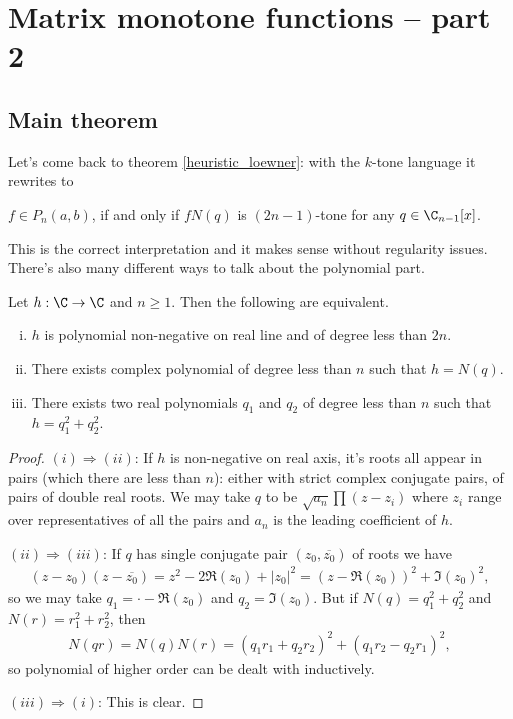 \chapter{Matrix monotone functions -- part 2}

\section{Main theorem}

Let's come back to theorem \ref{heuristic_loewner}: with the $k$-tone language it rewrites to

\begin{lause}\label{main_theorem}
	$f \in P_{n}(a, b)$, if and only if $f N(q)$ is $(2 n - 1)$-tone for any $q \in \C_{n - 1}[x]$.
\end{lause}

This is the correct interpretation and it makes sense without regularity issues. There's also many different ways to talk about the polynomial part.
\begin{lem}\label{polynomial_lemma}
	Let $h : \C \to \C$ and $n \geq 1$. Then the following are equivalent.
	\begin{enumerate}[(i)]
		\item $h$ is polynomial non-negative on real line and of degree less than $2 n$.
		\item There exists complex polynomial of degree less than $n$ such that $h = N(q)$.
		\item There exists two real polynomials $q_{1}$ and $q_{2}$ of degree less than $n$ such that $h = q_{1}^2 + q_{2}^2$.
	\end{enumerate}
\end{lem}
\begin{proof}
	$(i) \Rightarrow (ii)$: If $h$ is non-negative on real axis, it's roots all appear in pairs (which there are less than $n$): either with strict complex conjugate pairs, of pairs of double real roots. We may take $q$ to be $\sqrt{a_{n}}\prod (z - z_{i})$ where $z_{i}$ range over representatives of all the pairs and $a_{n}$ is the leading coefficient of $h$.

	$(ii) \Rightarrow (iii)$: If $q$ has single conjugate pair $(z_{0}, \overline{z_{0}})$ of roots we have
	\begin{align*}
		(z - z_{0}) (z - \overline{z_{0}}) = z^2 - 2 \Re(z_{0}) + |z_{0}|^2 = (z - \Re(z_{0}))^2 + \Im(z_{0})^2,
	\end{align*}
	so we may take $q_{1} = \cdot - \Re(z_{0})$ and $q_{2} = \Im(z_{0})$. But if $ N(q) = q_{1}^2 + q_{2}^2$ and $ N(r) = r_{1}^2 + r_{2}^2$, then
	\begin{align*}
		N(q r) = N(q) N(r) = (q_{1} r_{1} + q_{2} r_{2})^2 + (q_{1} r_{2} - q_{2} r_{1})^2,
	\end{align*}
	so polynomial of higher order can be dealt with inductively.

	$(iii) \Rightarrow (i)$: This is clear.
\end{proof}

